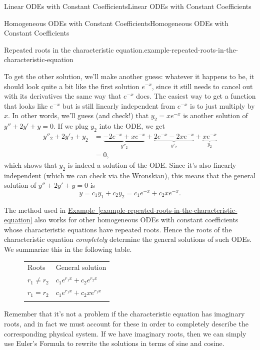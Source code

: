 \documentclass[10pt,]{book}
\numberwithin{equation}{section}
\newcommand{\hrulethick} {\noalign{\hrule height 0.11em}}
\newcommand{\amp}{&}
\begin{document}
\begin{chapterptx}{Linear ODEs with Constant Coefficients}{}{Linear ODEs with Constant Coefficients}{}{}
\begin{sectionptx}{Homogeneous ODEs with Constant Coefficients}{}{Homogeneous ODEs with Constant Coefficients}{}{}
\begin{example}{Repeated roots in the characteristic equation.}{example-repeated-roots-in-the-characteristic-equation}
\par
\hypertarget{p-195}{}%
To get the other solution, we'll make another guess: whatever it happens to be, it should look quite a bit like the first solution \(e^{-x}\), since it still needs to cancel out with its derivatives the same way that \(e^{-x}\) does. The easiest way to get a function that looks like \(e^{-x}\) but is still linearly independent from \(e^{-x}\) is to just multiply by \(x\). In other words, we'll guess (and check!) that \(y_{2} = xe^{-x}\) is another solution of \(y''+2y'+y = 0\). If we plug \(y_{2}\) into the ODE, we get%
\begin{align*}
y''_{2} + 2y'_{2} + y_{2} \amp = \underbrace{-2e^{-x} + xe^{-x}}_{y''_{2}} + \underbrace{2e^{-x} - 2xe^{-x}}_{y'_{2}} + \underbrace{xe^{-x}}_{y_{2}} \\
\amp = 0, 
\end{align*}
which shows that \(y_{2}\) is indeed a solution of the ODE. Since it's also linearly independent (which we can check via the Wronskian), this means that the general solution of \(y''+2y'+y=0\) is%
\begin{equation*}
y = c_{1}y_{1} + c_{2}y_{2} = c_{1}e^{-x} + c_{2}xe^{-x}. 
\end{equation*}
%
\end{example}
\hypertarget{p-196}{}%
The method used in \hyperref[example-repeated-roots-in-the-characteristic-equation]{Example~\ref{example-repeated-roots-in-the-characteristic-equation}} also works for other homogeneous ODEs with constant coefficients whose characteristic equations have repeated roots. Hence the roots of the characteristic equation \emph{completely} determine the general solutions of such ODEs. We summarize this in the following table.%
\begin{figure}
\centering
\leavevmode%
\begin{table}
\centering
\begin{tabular}{ll}\hrulethick
Roots&General solution\tabularnewline\hrulethick
\(r_{1}\neq r_{2}\)&\(c_{1}e^{r_{1}x} + c_{2}e^{r_{2}x}\)\tabularnewline\hrulethick
\(r_{1} = r_{2}\)&\(c_{1}e^{r_{1}x} + c_{2}xe^{r_{1}x}\)\tabularnewline\hrulethick
\end{tabular}
\end{table}
\end{figure}
\hypertarget{p-197}{}%
Remember that it's not a problem if the characteristic equation has imaginary roots, and in fact we must account for these in order to completely describe the corresponding physical system. If we have imaginary roots, then we can simply use Euler's Formula to rewrite the solutions in terms of sine and cosine.%

\end{sectionptx}
\end{chapterptx}
\end{document}

